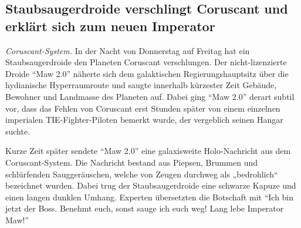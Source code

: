 \documentclass[final]{multiversum}
\begin{document}

\subsection{Staubsaugerdroide verschlingt Coruscant und erklärt sich zum neuen Imperator}

\textit{Coruscant-System.} 
In der Nacht von Donnerstag auf Freitag hat ein Staubsaugerdroide den Planeten Coruscant verschlungen. 
Der nicht-lizenzierte Droide \enquote{Maw 2.0} näherte sich dem galaktischen Regierungshauptsitz über die hydianische Hyperraumroute und saugte innerhalb kürzester Zeit Gebäude, Bewohner und Landmasse des Planeten auf. 
Dabei ging \enquote{Maw 2.0} derart subtil vor, dass das Fehlen von Coruscant erst Stunden später von einem einzelnen imperialen TIE-Fighter-Piloten bemerkt wurde, der vergeblich seinen Hangar suchte. 

Kurze Zeit später sendete \enquote{Maw 2.0} eine galaxisweite Holo-Nachricht aus dem Coruscant-System. 
Die Nachricht bestand aus Piepsen, Brummen und schlürfenden Sauggeräuschen, welche von Zeugen durchweg als „bedrohlich“ bezeichnet wurden. 
Dabei trug der Staubsaugerdroide eine schwarze Kapuze und einen langen dunklen Umhang. 
Experten übersetzten die Botschaft mit \enquote{Ich bin jetzt der Boss. 
Benehmt euch, sonst sauge ich euch weg! Lang lebe Imperator Maw!}
\end{document}
